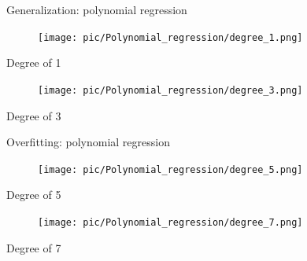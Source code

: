 \documentclass[serif, aspectratio=169]{beamer}
\begin{document}
\begin{frame}{Generalization: polynomial regression}
    \begin{minipage}{0.45\textwidth}
        \centering
        \begin{figure}[h]
        \texttt{[image: pic/Polynomial\_regression/degree\_1.png]}
        \end{figure}
        \begin{center}
            Degree of 1
        \end{center}
    \end{minipage}%
    \begin{minipage}{0.45\textwidth}
        \centering
        \begin{figure}[h]
        \texttt{[image: pic/Polynomial\_regression/degree\_3.png]}
        \end{figure}
        \begin{center}
            Degree of 3
        \end{center}
    \end{minipage}
    \vfill
\end{frame}

\begin{frame}{Overfitting: polynomial regression}
    \begin{minipage}{0.45\textwidth}
        \centering
        \begin{figure}[h]
        \texttt{[image: pic/Polynomial\_regression/degree\_5.png]}
        \end{figure}
        \begin{center}
            Degree of 5
        \end{center}
    \end{minipage}%
    \begin{minipage}{0.45\textwidth}
        \centering
        \begin{figure}[h]
        \texttt{[image: pic/Polynomial\_regression/degree\_7.png]}
        \end{figure}
        \begin{center}
            Degree of 7
        \end{center}
    \end{minipage}
    \vfill
\end{frame}
\end{document}
